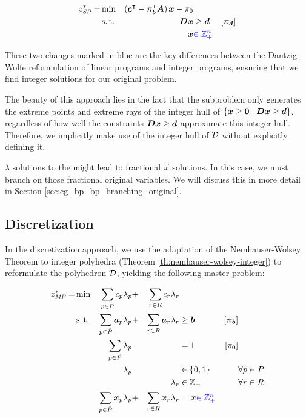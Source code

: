\begin{equation}
\begin{aligned}
z^*_\SP{} = &\min & \left( \vec{c}\transpose - \vec{\pi}_\vec{b}\transpose \mat{A} \right) \vec{x} - \pi_0 & & \\
&\st & \mat{D} \vec{x} & \geq \vec{d} & \left[\vec{\pi}_\vec{d}\right] \\
&& \vec{x} & {\color{blue} \in \mathbb{Z}_+^n}
\end{aligned}
\end{equation}

These two changes marked in blue are the key differences between the Dantzig-Wolfe reformulation of linear programs and integer programs, ensuring that we find integer solutions for our original problem.

The beauty of this approach lies in the fact that the subproblem only generates the extreme points and extreme rays of the integer hull of $\{{\bm{x}} \geq {\bm{0}} \mid {\bm{D}} {\bm{x}} \geq {\bm{d}}\}$, regardless of how well the constraints ${\bm{D}} {\bm{x}} \geq {\bm{d}}$ approximate this integer hull. Therefore, we implicitly make use of the integer hull of $\mathcal{D}$ without explicitly defining it.

$\lambda$ solutions to the \MP{} might lead to fractional $\vec{x}$ solutions. In this case, we must branch on those fractional original variables. We will discuss this in more detail in Section \ref{sec:cg_bp_bp_branching_original}.

\subsection{Discretization}\label{sec:cg_bp_ip_discretization}
In the discretization approach, we use the adaptation of the Nemhauser-Wolsey Theorem to integer polyhedra (Theorem \ref{th:nemhauser-wolsey-integer}) to reformulate the polyhedron $\mathcal{D}$, yielding the following master problem:

\begin{equation}
\begin{aligned}
z^*_{\textit{MP}}{} = &\min & \sum_{p \in \ddot{P}} c_p \lambda_p &+ &\sum_{r \in R} c_r \lambda_r & & & \\
&\operatorname{s.t.} & \sum_{p \in \ddot{P}} {\bm{a}}_p \lambda_p &+ &\sum_{r \in R} {\bm{a}}_r \lambda_r & \geq {\bm{b}} & \left[{\bm{\pi}}_{\bm{b}}\right] \\
&& \sum_{p \in \ddot{P}} \lambda_p & & & = 1 & \left[\pi_0 \right] & \\
&& \lambda_p & & & \in \{0, 1\} & & \forall p \in \ddot{P} \\
&& & & \lambda_r & \in \mathbb{Z}_+ & & \forall r \in R \\
&& \sum_{p \in \ddot{P}} {\bm{x}}_p \lambda_p &+ &\sum_{r \in R} {\bm{x}}_r \lambda_r & = {\bm{x}} {\color{blue} \in \mathbb{Z}_+^n} & &
\end{aligned}
\end{equation}

